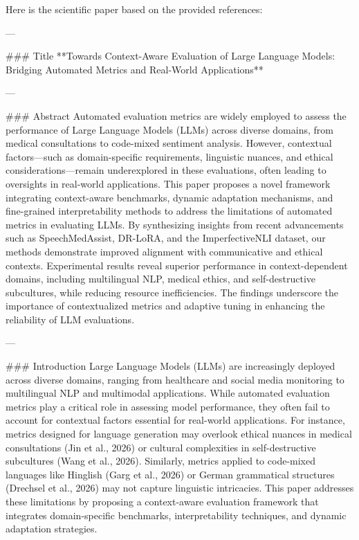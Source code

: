Here is the scientific paper based on the provided references:

---

### Title  
**Towards Context-Aware Evaluation of Large Language Models: Bridging Automated Metrics and Real-World Applications**

---

### Abstract  
Automated evaluation metrics are widely employed to assess the performance of Large Language Models (LLMs) across diverse domains, from medical consultations to code-mixed sentiment analysis. However, contextual factors—such as domain-specific requirements, linguistic nuances, and ethical considerations—remain underexplored in these evaluations, often leading to oversights in real-world applications. This paper proposes a novel framework integrating context-aware benchmarks, dynamic adaptation mechanisms, and fine-grained interpretability methods to address the limitations of automated metrics in evaluating LLMs. By synthesizing insights from recent advancements such as SpeechMedAssist, DR-LoRA, and the ImperfectiveNLI dataset, our methods demonstrate improved alignment with communicative and ethical contexts. Experimental results reveal superior performance in context-dependent domains, including multilingual NLP, medical ethics, and self-destructive subcultures, while reducing resource inefficiencies. The findings underscore the importance of contextualized metrics and adaptive tuning in enhancing the reliability of LLM evaluations.

---

### Introduction  
Large Language Models (LLMs) are increasingly deployed across diverse domains, ranging from healthcare and social media monitoring to multilingual NLP and multimodal applications. While automated evaluation metrics play a critical role in assessing model performance, they often fail to account for contextual factors essential for real-world applications. For instance, metrics designed for language generation may overlook ethical nuances in medical consultations (Jin et al., 2026) or cultural complexities in self-destructive subcultures (Wang et al., 2026). Similarly, metrics applied to code-mixed languages like Hinglish (Garg et al., 2026) or German grammatical structures (Drechsel et al., 2026) may not capture linguistic intricacies. This paper addresses these limitations by proposing a context-aware evaluation framework that integrates domain-specific benchmarks, interpretability techniques, and dynamic adaptation strategies.

